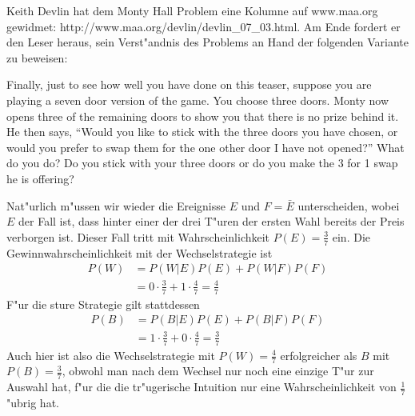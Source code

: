 Keith Devlin hat dem Monty Hall Problem eine Kolumne auf www.maa.org
gewidmet: http://www.maa.org/devlin/devlin\_07\_03.html. Am Ende
fordert er den Leser heraus, sein Verst"andnis des Problems an
Hand der folgenden Variante zu beweisen:
\medskip

Finally, just to see how well you have done on this teaser, suppose
you are playing a seven door version of the game. You choose three
doors. Monty now opens three of the remaining doors to show you
that there is no prize behind it. He then says, ``Would you like to
stick with the three doors you have chosen, or would you prefer to
swap them for the one other door I have not opened?'' What do you
do? Do you stick with your three doors or do you make the 3 for 1
swap he is offering?

\begin{loesung}
Nat"urlich m"ussen wir wieder die Ereignisse $E$ und $F=\bar E$ unterscheiden,
wobei $E$ der Fall ist, dass hinter einer der drei T"uren der ersten Wahl
bereits der Preis verborgen ist.  Dieser Fall tritt mit Wahrscheinlichkeit
$P(E)=\frac37$ ein.
Die Gewinnwahrscheinlichkeit mit der Wechselstrategie ist
\begin{align*}
P(W)&=P(W|E)P(E)+P(W|F)P(F)\\
&=0\cdot \frac37+1\cdot\frac47=\frac47
\end{align*}
F"ur die sture Strategie gilt stattdessen
\begin{align*}
P(B)&=P(B|E)P(E)+P(B|F)P(F)\\
&=1\cdot \frac37+0\cdot\frac47=\frac37
\end{align*}
Auch hier ist also die Wechselstrategie mit $P(W)=\frac47$
erfolgreicher als $B$ mit $P(B)=\frac37$, obwohl man
nach dem Wechsel nur noch eine einzige T"ur zur Auswahl hat, f"ur
die die tr"ugerische Intuition nur eine Wahrscheinlichkeit von
$\frac17$ "ubrig hat.
\end{loesung}

